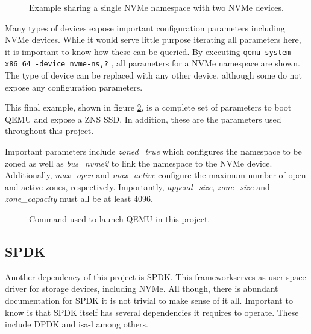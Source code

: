 \documentclass[conference]{IEEEtran}
\newcommand\bashstyle{
	\lstset{
		language=Bash,
		basicstyle=\ttm,
		showstringspaces=false,
		tabsize=2,
		aboveskip=0.2cm,
		belowskip=0.2cm,
		prebreak=\textbackslash,
		extendedchars=true,
		mathescape=false,
		linewidth=8.85cm,
		breaklines=true
	}
}
\newcommand\bashinline[1]{{\bashstyle\lstinline!#1!}}
\newcommand\bashexternal[2][]{{\bashstyle}}
\begin{document}
\begin{center}
	\begin{figure}[H]
		\bashexternal{resources/bash/nvme-subsystem.sh}
		\captionsetup{justification=centering}
		\caption{Example sharing a single NVMe namespace with two NVMe devices.}
		\label{fig:example-nvme-subsystems}
	\end{figure}
\end{center}

Many types of devices expose important configuration parameters including
NVMe devices. While it would serve little purpose iterating all parameters here,
it is important to know how these can be queried. By
executing\bashinline{qemu-system-x86_64 -device nvme-ns,?} , all parameters for
a NVMe namespace are shown. The type of device can be replaced with any other
device, although some do not expose any configuration parameters.

This final example, shown in figure \ref{fig:qemu-launch}, is a complete set of
parameters to boot QEMU and expose a ZNS SSD. In addition, these are the
parameters used throughout this project.

Important parameters include \textit{zoned=true} which configures the namespace
to be zoned as well as \textit{bus=nvme2} to link the namespace to the NVMe
device. Additionally, \textit{max\_open} and \textit{max\_active} configure the
maximum number of open and active zones, respectively. Importantly,
\textit{append\_size}, \textit{zone\_size} and \textit{zone\_capacity} must all
be at least 4096.

\begin{center}
	\begin{figure}[H]
		\bashexternal{resources/bash/qemu-launch.sh}
		\captionsetup{justification=centering}
		\caption{Command used to launch QEMU in this project.}
		\label{fig:qemu-launch}
	\end{figure}
\end{center}

\subsection{SPDK}

Another dependency of this project is SPDK. This framework\footnotemark[2]
serves as user space driver for storage devices, including NVMe. All though,
there is abundant documentation for SPDK it is not trivial to make sense of it
all. Important to know is that SPDK itself has several dependencies it requires
to operate. These include DPDK and isa-l among others.
\end{document}
